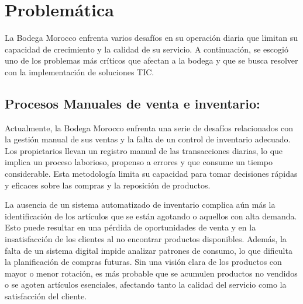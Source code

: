 \documentclass{article}
\newenvironment{problematica}{}{}
\begin{document}
\begin{problematica}
  \section{Problemática}

  La Bodega Morocco enfrenta varios desafíos en su operación diaria que limitan su capacidad de crecimiento y la calidad de su servicio. A continuación, se escogió uno de los problemas más críticos que afectan a la bodega y que se busca resolver con la implementación de soluciones TIC.

  \subsection{Procesos Manuales de venta e inventario:}

  Actualmente, la Bodega Morocco enfrenta una serie de desafíos relacionados con la gestión manual de sus ventas y la falta de un control de inventario adecuado. Los propietarios llevan un registro manual de las transacciones diarias, lo que implica un proceso laborioso, propenso a errores y que consume un tiempo considerable. Esta metodología limita su capacidad para tomar decisiones rápidas y eficaces sobre las compras y la reposición de productos.

  La ausencia de un sistema automatizado de inventario complica aún más la identificación de los artículos que se están agotando o aquellos con alta demanda. Esto puede resultar en una pérdida de oportunidades de venta y en la insatisfacción de los clientes al no encontrar productos disponibles. Además, la falta de un sistema digital impide analizar patrones de consumo, lo que dificulta la planificación de compras futuras. Sin una visión clara de los productos con mayor o menor rotación, es más probable que se acumulen productos no vendidos o se agoten artículos esenciales, afectando tanto la calidad del servicio como la satisfacción del cliente.

\end{problematica}

\newpage
\end{document}
